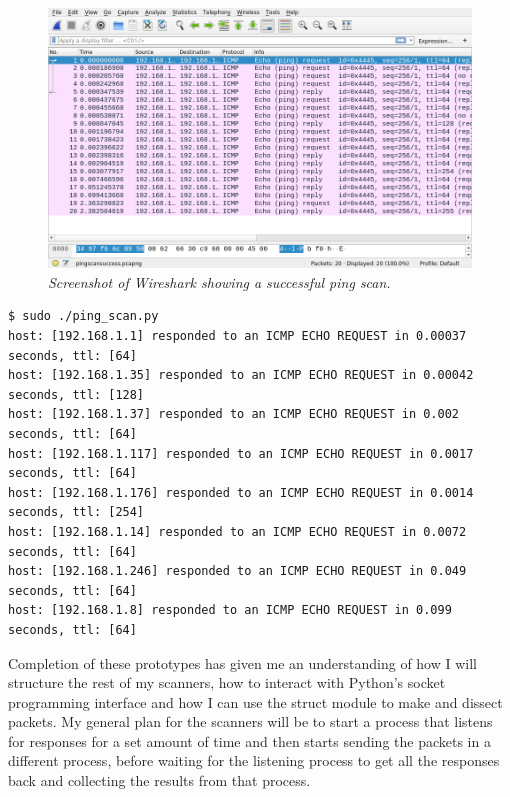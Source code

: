 \documentclass[titlepage]{article}
\begin{document}
\begin{figure}[H]
  \centering
  \includegraphics[width=\textwidth]{pingscan.png}
  \caption{\textit{%
    Screenshot of Wireshark showing a successful ping scan.
}}\label{pingscansuccess}
\end{figure}

\lstset{language=C}
\begin{lstlisting}[label=pingscanout,caption=\textit{The output of from the ping scanner on the run which generated the \gls{pcap} file in figure~\ref{pingscansuccess}}]
$ sudo ./ping_scan.py
host: [192.168.1.1]	responded to an ICMP ECHO REQUEST in 0.00037    seconds, ttl: [64]
host: [192.168.1.35] responded to an ICMP ECHO REQUEST in 0.00042    seconds, ttl: [128]
host: [192.168.1.37] responded to an ICMP ECHO REQUEST in 0.002      seconds, ttl: [64]
host: [192.168.1.117] responded to an ICMP ECHO REQUEST in 0.0017     seconds, ttl: [64]
host: [192.168.1.176] responded to an ICMP ECHO REQUEST in 0.0014     seconds, ttl: [254]
host: [192.168.1.14] responded to an ICMP ECHO REQUEST in 0.0072     seconds, ttl: [64]
host: [192.168.1.246] responded to an ICMP ECHO REQUEST in 0.049      seconds, ttl: [64]
host: [192.168.1.8] responded to an ICMP ECHO REQUEST in 0.099      seconds, ttl: [64]
\end{lstlisting}

Completion of these prototypes has given me an understanding of how I will structure the rest of
my scanners, how to interact with Python's socket programming interface and how I can use the
struct module to make and dissect packets. My general plan for the scanners will be to start
a process that listens for responses for a set amount of time and then starts sending the packets
in a different process, before waiting for the listening process to get all the responses back and
collecting the results from that process.
\end{document}
